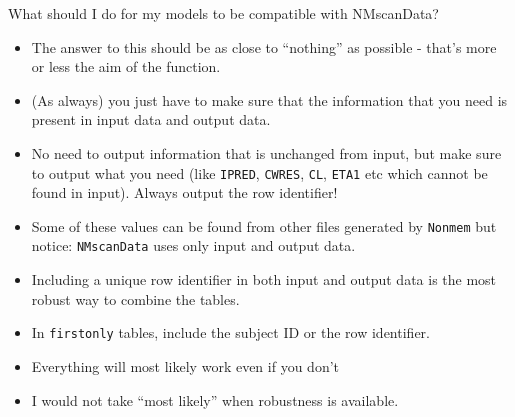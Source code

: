 \documentclass[
  8pt,
  ignorenonframetext,
  aspectratio=169]{beamer}
\begin{document}
\begin{frame}[fragile]{What should I do for my models to be compatible
with NMscanData?}
\protect\hypertarget{what-should-i-do-for-my-models-to-be-compatible-with-nmscandata}{}
\begin{itemize}
\item
  The answer to this should be as close to ``nothing'' as possible -
  that's more or less the aim of the function.
\item
  (As always) you just have to make sure that the information that you
  need is present in input data and output data.
\item
  No need to output information that is unchanged from input, but make
  sure to output what you need (like \texttt{IPRED}, \texttt{CWRES},
  \texttt{CL}, \texttt{ETA1} etc which cannot be found in input). Always
  output the row identifier!
\item
  Some of these values can be found from other files generated by
  \texttt{Nonmem} but notice: \texttt{NMscanData} uses only input and
  output data.
\item
  Including a unique row identifier in both input and output data is the
  most robust way to combine the tables.
\item
  In \texttt{firstonly} tables, include the subject ID or the row
  identifier.
\item
  Everything will most likely work even if you don't
\item
  I would not take ``most likely'' when robustness is available.
\end{itemize}
\end{frame}
\end{document}
